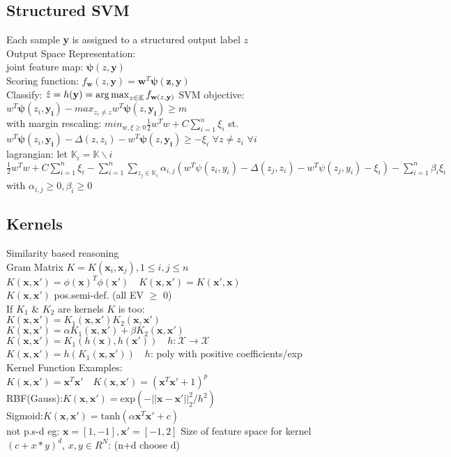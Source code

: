 \subsection*{Structured SVM}
Each sample \textbf{y} is assigned to a structured output label $z$\\
Output Space Representation:\\
joint feature map: $\mathbf{\psi}(z,\mathbf{y})$\\
Scoring function: $f_{\mathbf{w}}(z,\mathbf{y})=\mathbf{w}^T\mathbf{\psi(z, \mathbf{y})}$\\
Classify: $\hat{z}=h(\mathbf{y})=\operatorname*{arg\,max}_{z\in\mathbb{K}}f_{\mathbf{w}(z, \mathbf{y})}$
SVM objective:  $w^T\mathbf{\psi}(z_i,\mathbf{y_i})-max_{z_i \neq z}w^T\mathbf{\psi}(z,\mathbf{y_i}) \geq m$ \\
with margin rescaling: $min_{w, \xi \geq 0} \frac{1}{2}w^Tw + C \sum_{i=1}^n \xi_i$ st. $w^T\mathbf{\psi}(z_i,\mathbf{y_i})-\Delta(z,z_i)
-w^T\mathbf{\psi}(z,\mathbf{y_i}) \geq - \xi_i$ $\forall z \neq z_i$ $\forall i$ \\
lagrangian: let $\mathbb{K}_i = \mathbb{K} \backslash i$ \\ $\frac{1}{2}w^Tw + C \sum_{i=1}^n \xi_i - \sum_{i=1}^n \sum_{z_j \in \mathbb{K}_i} \alpha_{i,j} (w^T \psi(z_i, y_i)- \Delta (z_j, z_i) - w^T \psi(z_j,y_i)- \xi_i) - \sum_{i=1}^n \beta_i \xi_i$ with $\alpha_{i,j} \geq 0, \beta_i \geq 0$ \\
\subsection*{Kernels}
Similarity based reasoning\\
Gram Matrix $K{=}K(\mathbf{x}_i, \mathbf{x}_j), 1{\leq} i,j{\leq} n$\\
$K(\mathbf{x}, \mathbf{x'}) {=} \phi(\mathbf{x})^T\phi(\mathbf{x'})\quad K(\mathbf{x},\mathbf{x'}){=}K(\mathbf{x'},\mathbf{x})$\\
$K(\mathbf{x},\mathbf{x'})$ pos.semi-def. (all EV $\geq$ 0)\\
If $K_1$ \& $K_2$ are kernels $K$ is too:\\
$K(\mathbf{x}, \mathbf{x'})=K_1(\mathbf{x}, \mathbf{x'})K_2(\mathbf{x}, \mathbf{x'})$\\
$K(\mathbf{x},\mathbf{x'})=\alpha K_1(\mathbf{x}, \mathbf{x'})+\beta K_2(\mathbf{x}, \mathbf{x'})$\\
$K(\mathbf{x},\mathbf{x'}){=}K_1(h(\mathbf{x}), h(\mathbf{x'}))\quad h:\mathcal{X}{\rightarrow}\mathcal{X}$\\
$K(\mathbf{x},\mathbf{x'}){=}h(K_1(\mathbf{x}, \mathbf{x'}))\quad h$: poly with positive coefficients/exp\\
Kernel Function Examples:\\
$K(\mathbf{x},\mathbf{x'}){=}\mathbf{x}^T\mathbf{x'}\quad K(\mathbf{x},\mathbf{x'}){=}(\mathbf{x}^T\mathbf{x'}{+}1)^p$\\
RBF(Gauss):$K(\mathbf{x},\mathbf{x'}){=}\mathrm{exp}(-||\mathbf{x}{-}\mathbf{x'}||_2^2/h^2)$\\
Sigmoid:$K(\mathbf{x},\mathbf{x'}){=}\mathrm{tanh}(\alpha\mathbf{x}^T\mathbf{x'}+c)$\\
not p.s-d eg: $\mathbf{x}{=}[1,-1], \mathbf{x'}{=}[-1,2]$
Size of feature space for kernel $(c+x*y)^d$, $x,y \in R^N$: (n+d choose d)